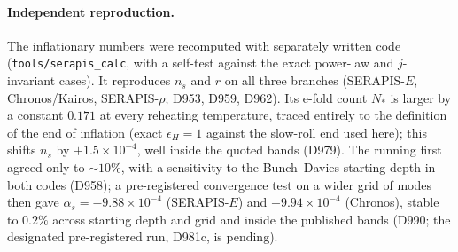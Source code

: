 \documentclass[aps,prd,twocolumn,superscriptaddress,nofootinbib,floatfix]{revtex4-2}
\begin{document}
\paragraph{Independent reproduction.} The inflationary numbers were recomputed with separately written code (\texttt{tools/serapis\_calc}, with a self-test against the exact power-law and $j$-invariant cases). It reproduces $n_s$ and $r$ on all three branches (SERAPIS-$E$, Chronos/Kairos, SERAPIS-$\rho$; D953, D959, D962). Its e-fold count $N_*$ is larger by a constant $0.171$ at every reheating temperature, traced entirely to the definition of the end of inflation (exact $\epsilon_H=1$ against the slow-roll end used here); this shifts $n_s$ by $+1.5\times10^{-4}$, well inside the quoted bands (D979). The running first agreed only to $\sim10\%$, with a sensitivity to the Bunch--Davies starting depth in both codes (D958); a pre-registered convergence test on a wider grid of modes then gave $\alpha_s=-9.88\times10^{-4}$ (SERAPIS-$E$) and $-9.94\times10^{-4}$ (Chronos), stable to $0.2\%$ across starting depth and grid and inside the published bands (D990; the designated pre-registered run, D981c, is pending).
\end{document}
